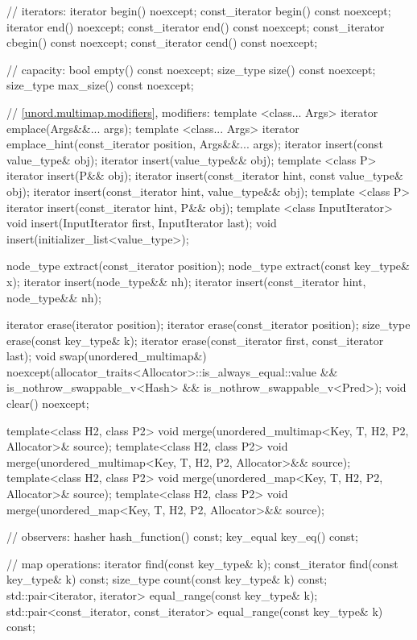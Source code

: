 \begin{codeblock}
{{    // iterators:
    iterator       begin() noexcept;
    const_iterator begin() const noexcept;
    iterator       end() noexcept;
    const_iterator end() const noexcept;
    const_iterator cbegin() const noexcept;
    const_iterator cend() const noexcept;

    // capacity:
    bool      empty() const noexcept;
    size_type size() const noexcept;
    size_type max_size() const noexcept;

    // \ref{unord.multimap.modifiers}, modifiers:
    template <class... Args> iterator emplace(Args&&... args);
    template <class... Args> iterator emplace_hint(const_iterator position, Args&&... args);
    iterator insert(const value_type& obj);
    iterator insert(value_type&& obj);
    template <class P> iterator insert(P&& obj);
    iterator insert(const_iterator hint, const value_type& obj);
    iterator insert(const_iterator hint, value_type&& obj);
    template <class P> iterator insert(const_iterator hint, P&& obj);
    template <class InputIterator> void insert(InputIterator first, InputIterator last);
    void insert(initializer_list<value_type>);

    node_type extract(const_iterator position);
    node_type extract(const key_type& x);
    iterator insert(node_type&& nh);
    iterator insert(const_iterator hint, node_type&& nh);

    iterator  erase(iterator position);
    iterator  erase(const_iterator position);
    size_type erase(const key_type& k);
    iterator  erase(const_iterator first, const_iterator last);
    void      swap(unordered_multimap&)
      noexcept(allocator_traits<Allocator>::is_always_equal::value &&
               is_nothrow_swappable_v<Hash> &&
               is_nothrow_swappable_v<Pred>);
    void      clear() noexcept;

    template<class H2, class P2>
      void merge(unordered_multimap<Key, T, H2, P2, Allocator>& source);
    template<class H2, class P2>
      void merge(unordered_multimap<Key, T, H2, P2, Allocator>&& source);
    template<class H2, class P2>
      void merge(unordered_map<Key, T, H2, P2, Allocator>& source);
    template<class H2, class P2>
      void merge(unordered_map<Key, T, H2, P2, Allocator>&& source);

    // observers:
    hasher hash_function() const;
    key_equal key_eq() const;

    // map operations:
    iterator       find(const key_type& k);
    const_iterator find(const key_type& k) const;
    size_type      count(const key_type& k) const;
    std::pair<iterator, iterator>             equal_range(const key_type& k);
    std::pair<const_iterator, const_iterator> equal_range(const key_type& k) const;

}}
\end{codeblock}
